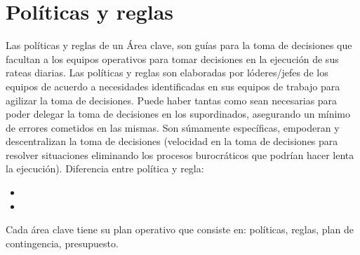 

\section{Políticas y reglas}
Las políticas y reglas de un Área clave, son guías para la toma de decisiones que facultan a los equipos operativos para tomar decisiones en la ejecución de sus rateas diarias. \newline \newline 
Las políticas y reglas son elaboradas por lóderes/jefes de los equipos de acuerdo a necesidades identificadas en sus equipos de trabajo para agilizar la toma de decisiones. \newline \newline 
Puede haber tantas como sean necesarias para poder delegar la toma de decisiones en los supordinados, asegurando un mínimo de errores cometidos en las mismas. \newline \newline 
Son súmamente específicas, empoderan y descentralizan la toma de decisiones (velocidad en la toma de decisiones para resolver situaciones eliminando los procesos burocráticos que podrían hacer lenta la ejecución).\newline \newline 
Diferencia entre política y regla:
\begin{itemize}
    \item {} 
    \item {} 
\end{itemize}

Cada área clave tiene su plan operativo que consiste en: políticas, reglas, plan de contingencia, presupuesto.
